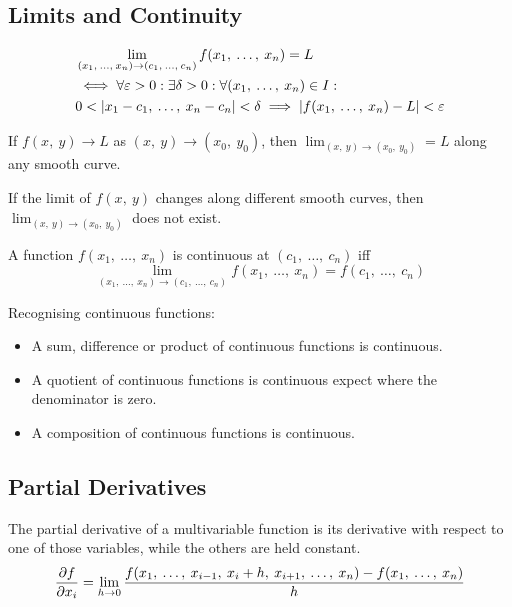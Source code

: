 \documentclass{article}
\begin{document}
\subsection{Limits and Continuity}
\begin{definition}
    \begin{align*}
		&\lim_{(x_1,\: \ldots,\: x_n)\to (c_1,\: \ldots,\: c_n)} f(x_1,\: \ldots,\: x_n) = L \\
        &\iff\forall\varepsilon>0: \exists\delta>0: \forall (x_1,\: \ldots,\: x_n) \in I: \\
        &0<\abs{x_1-c_1,\: \ldots,\: x_n-c_n}<\delta \implies \abs{f(x_1,\: \ldots,\: x_n)-L}<\varepsilon
	\end{align*}
\end{definition}
\begin{theorem}
    If $f(x,\: y) \to L$ as $(x,\: y) \to (x_0,\: y_0)$, then
    $\displaystyle \lim_{(x,\: y) \to (x_0,\: y_0)} = L$ along any smooth
    curve.
\end{theorem}
\begin{theorem}
    If the limit of $f(x,\: y)$ changes along different smooth curves, then
    $\displaystyle \lim_{(x,\: y) \to (x_0,\: y_0)}$ does not exist.
\end{theorem}
\begin{theorem}
    A function $f(x_1,\: \ldots,\: x_n)$ is continuous at
    $(c_1,\: \ldots,\: c_n)$ iff
    \begin{equation*}
        \lim_{(x_1,\: \ldots,\: x_n)\to (c_1,\: \ldots,\: c_n)} f(x_1,\: \ldots,\: x_n) = f(c_1,\: \ldots,\: c_n)
    \end{equation*}
\end{theorem}
Recognising continuous functions:
\begin{itemize}
    \item A sum, difference or product of continuous functions is continuous.
    \item A quotient of continuous functions is continuous expect where the
        denominator is zero.
    \item A composition of continuous functions is continuous.
\end{itemize}
\subsection{Partial Derivatives}
\begin{definition}
    The partial derivative of a multivariable function is its derivative with
    respect to one of those variables, while the others are held constant.
    \begin{equation*}
        \pdv{f}{x_i} = \lim_{h \to 0} \frac{f(x_1,\: \ldots,\: x_{i-1},\: x_i+h,\: x_{i+1},\: \ldots,\: x_n) - f(x_1,\: \ldots,\: x_n)}{h}
    \end{equation*}
\end{definition}
\end{document}

